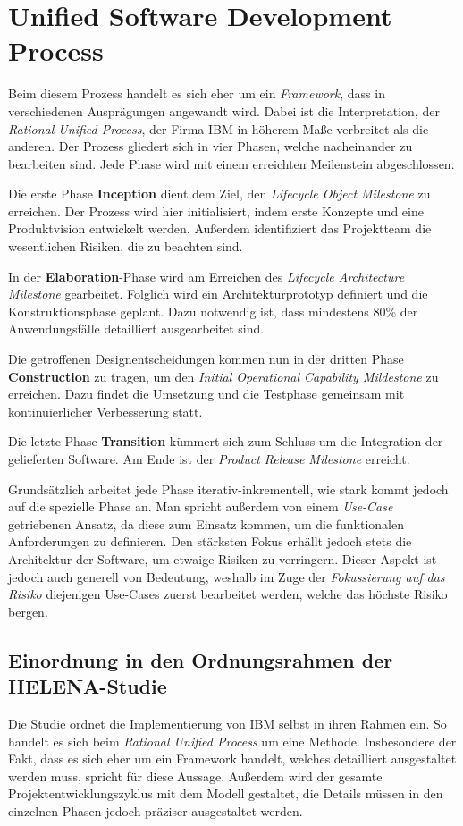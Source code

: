 \section{Unified Software Development Process}

Beim diesem Prozess handelt es sich eher um ein \textit{Framework}, dass in verschiedenen Ausprägungen angewandt wird. Dabei ist die Interpretation, der \textit{Rational Unified Process}, der Firma IBM in höherem Maße verbreitet als die anderen. Der Prozess gliedert sich in vier Phasen, welche nacheinander zu bearbeiten sind. Jede Phase wird mit einem erreichten Meilenstein abgeschlossen. 

Die erste Phase \textbf{Inception} dient dem Ziel, den \textit{Lifecycle Object Milestone} zu erreichen. Der Prozess wird hier initialisiert, indem erste Konzepte und eine Produktvision entwickelt werden. Außerdem identifiziert das Projektteam die wesentlichen Risiken, die zu beachten sind.

In der \textbf{Elaboration}-Phase wird am Erreichen des \textit{Lifecycle Architecture Milestone} gearbeitet. Folglich wird ein Architekturprototyp definiert und die Konstruktionsphase geplant. Dazu notwendig ist, dass mindestens 80\% der Anwendungsfälle detailliert ausgearbeitet sind.

Die getroffenen Designentscheidungen kommen nun in der dritten Phase \textbf{Construction} zu tragen, um den \textit{Initial Operational Capability Mildestone} zu erreichen. Dazu findet die Umsetzung und die Testphase gemeinsam mit kontinuierlicher Verbesserung statt.

Die letzte Phase \textbf{Transition} kümmert sich zum Schluss um die Integration der gelieferten Software. Am Ende ist der \textit{Product Release Milestone} erreicht.

Grundsätzlich arbeitet jede Phase iterativ-inkrementell, wie stark kommt jedoch auf die spezielle Phase an. Man spricht außerdem von einem \textit{Use-Case} getriebenen Ansatz, da diese zum Einsatz kommen, um die funktionalen Anforderungen zu definieren. Den stärksten Fokus erhällt jedoch stets die Architektur der Software, um etwaige Risiken zu verringern. Dieser Aspekt ist jedoch auch generell von Bedeutung, weshalb im Zuge der \textit{Fokussierung auf das Risiko} diejenigen Use-Cases zuerst bearbeitet werden, welche das höchste Risiko bergen.

\subsection{Einordnung in den Ordnungsrahmen der HELENA-Studie}
Die Studie ordnet die Implementierung von IBM selbst in ihren Rahmen ein. So handelt es sich beim \textit{Rational Unified Process} um eine Methode. Insbesondere der Fakt, dass es sich eher um ein Framework handelt, welches detailliert ausgestaltet werden muss, spricht für diese Aussage. Außerdem wird der gesamte Projektentwicklungszyklus mit dem Modell gestaltet, die Details müssen in den einzelnen Phasen jedoch präziser ausgestaltet werden.

